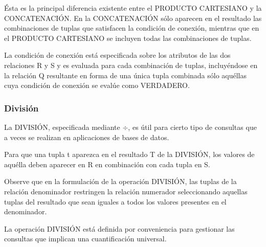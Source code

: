 Ésta es la principal diferencia existente entre el PRODUCTO CARTESIANO y la CONCATENACIÓN. En la CONCATENACIÓN sólo aparecen en el resultado las combinaciones de tuplas que satisfacen la condición de conexión, mientras que en el PRODUCTO CARTESIANO
se incluyen todas las combinaciones de tuplas.


La condición de conexión está especificada sobre los atributos de las dos relaciones R y S y es evaluada para cada combinación de tuplas, incluyéndose en la relación Q resultante en forma de una única tupla combinada sólo aquéllas cuya condición de conexión se evalúe como VERDADERO.

\subsubsection*{División}

La DIVISIÓN, especificada mediante $\div$, es útil para cierto tipo de consultas que a veces se realizan en aplicaciones de bases de datos. 


Para que una tupla t aparezca en el resultado T de la DIVISIÓN, los valores de aquélla deben aparecer en R en combinación con cada tupla en S.


Observe que en la formulación de la operación DIVISIÓN, las tuplas de la relación denominador restringen la relación numerador seleccionando aquellas tuplas del resultado que sean iguales a todos los valores presentes en el denominador. 

La operación DIVISIÓN está definida por conveniencia para gestionar las consultas que implican una cuantificación universal.